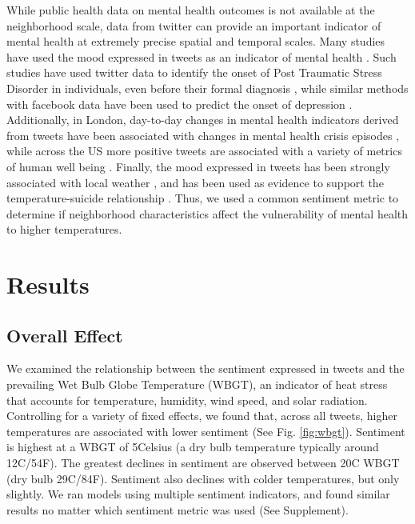 \documentclass{article}
\begin{document}
While public health data on mental health outcomes is not available at the neighborhood scale, data from twitter can provide an important indicator of mental health at extremely precise spatial and temporal scales.  Many studies have used the mood expressed in tweets as an indicator of mental health \cite{Edo-Osagie2020Jul, Sinnenberg2016Dec}.  Such studies have used twitter data to identify the onset of Post Traumatic Stress Disorder in individuals, even before their formal diagnosis \cite{Reece2017Oct}, while similar methods with facebook data have been used to predict the onset of depression \cite{Eichstaedt2018Oct}.  Additionally, in London, day-to-day changes in mental health indicators derived from tweets have been associated with changes in mental health crisis episodes \cite{Kolliakou2020Feb}, while across the US more positive tweets are associated with a variety of metrics of human well being \cite{Mitchell2013May}.  Finally, the mood expressed in tweets has been strongly associated with local weather \cite{baylis_weather_2018}, and has been used as evidence to support the temperature-suicide relationship \cite{Burke2018Aug}.  Thus, we used a common sentiment metric to determine if neighborhood characteristics affect the vulnerability of mental health to higher temperatures.

\section{Results}

\subsection{Overall Effect}
We examined the relationship between the sentiment expressed in tweets and the prevailing Wet Bulb Globe Temperature (WBGT), an indicator of heat stress that accounts for temperature, humidity, wind speed, and solar radiation.  Controlling for a variety of fixed effects, we found that, across all tweets, higher temperatures are associated with lower sentiment (See Fig. \ref{fig:wbgt}).  Sentiment is highest at a WBGT of 5\textdegree Celsius (a dry bulb temperature typically around 12\textdegree C/54\textdegree F).  The greatest declines in sentiment are observed between 20\textdegree C WBGT (dry bulb 29\textdegree C/84\textdegree F).  Sentiment also declines with colder temperatures, but only slightly.  We ran models using multiple sentiment indicators, and found similar results no matter which sentiment metric was used (See Supplement).
\end{document}
